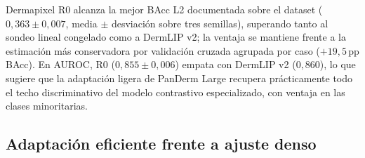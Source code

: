 \begin{table}[htbp]
\centering
\footnotesize
\setlength{\tabcolsep}{4pt}
\renewcommand{\arraystretch}{0.95}
\caption{Comparativa sobre el nivel L2 de DermapixelAI~1.0
($38$ clases con queratinización consolidada,
$N_{\mathrm{test}} = 36$) entre Dermapixel R0 y las referencias
internas del trabajo. La fila LP CV se considera la cifra honesta
del sondeo lineal congelado por su independencia del \emph{split}
fijo y por su anclaje en validación cruzada agrupada por caso
(sección~\ref{sec:dermapixel-results}). Mejor valor por
columna en negrita.}
\label{tab:dermapixel-spanderm-comp}
\end{table}

Dermapixel R0 alcanza la mejor BAcc L2 documentada sobre el dataset
($0{,}363 \pm 0{,}007$, media $\pm$ desviación sobre tres semillas),
superando tanto al sondeo lineal congelado como a DermLIP v2; la
ventaja se mantiene frente a la estimación más conservadora por
validación cruzada agrupada por caso ($+19{,}5$\,pp BAcc). En AUROC,
R0 ($0{,}855 \pm 0{,}006$) empata con DermLIP v2 ($0{,}860$), lo que
sugiere que la adaptación ligera de PanDerm Large recupera
prácticamente todo el techo discriminativo del modelo contrastivo
especializado, con ventaja en las clases minoritarias.

\subsection{Adaptación eficiente frente a ajuste denso}

